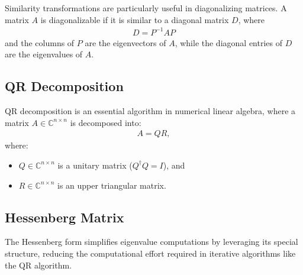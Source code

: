 \documentclass[12pt]{article}
\numberwithin{equation}{subsubsection}
\begin{document}
Similarity transformations are particularly useful in diagonalizing matrices. A matrix $A$ is diagonalizable if it is similar to a diagonal matrix $D$, where
\begin{align}
	D = P^{-1}AP
\end{align}
and the columns of $P$ are the eigenvectors of $A$, while the diagonal entries of $D$ are the eigenvalues of $A$.

\subsection{QR Decomposition}
QR decomposition is an essential algorithm in numerical linear algebra, where a matrix $ A \in \mathbb{C}^{n \times n} $ is decomposed into:
\begin{align}
	A = QR,
\end{align}
where:
\begin{itemize}
	\item $ Q \in \mathbb{C}^{n \times n} $ is a unitary matrix ($ Q^\dagger Q = I $), and
	\item $ R \in \mathbb{C}^{n \times n} $ is an upper triangular matrix.
\end{itemize}

\subsection{Hessenberg Matrix}

The Hessenberg form simplifies eigenvalue computations by leveraging its special structure, reducing the computational effort required in iterative algorithms like the QR algorithm.
\end{document}
